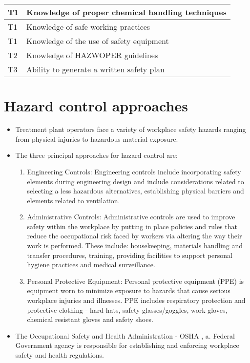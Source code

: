 \begin{table}[H]
\begin{tabular}{| m{1cm} |m{15cm} |}
T1 & Knowledge of proper   chemical handling techniques                                                                                \\ \hline
T1 & Knowledge of safe   working practices                                                                                             \\ \hline
T1 & Knowledge of the use   of safety equipment                                                                                        \\ \hline
T2 & Knowledge of HAZWOPER   guidelines                                                                                                \\ \hline
T3 & Ability to generate a   written safety plan                                                                                       \\ \hline
\end{tabular}
\end{table}
\newpage


\section{Hazard control approaches}
\begin{itemize}
\item Treatment plant operators face a variety of workplace safety hazards ranging from physical injuries to hazardous material exposure.  
\item The three principal approaches for hazard control are:
\begin{enumerate}
\item Engineering Controls:  Engineering controls include incorporating safety elements during engineering design and include considerations related to selecting a less hazardous alternatives, establishing  physical barriers and elements related to ventilation.
\item Administrative Controls:  Administrative controls are used to improve safety within the workplace by putting in place policies and rules that reduce the occupational risk faced by workers via altering the way their work is performed.  These include: housekeeping, materials handling and transfer procedures, training, providing facilities to support personal hygiene practices and medical surveillance.
\item Personal Protective Equipment: Personal protective equipment (PPE) is equipment worn to minimize exposure to hazards that cause serious workplace injuries and illnesses.  PPE includes respiratory protection and protective clothing - hard hats, safety
glasses/goggles, work gloves, chemical resistant gloves and safety shoes.

\end{enumerate}
\item The Occupational Safety and Health Administration - OSHA , a. Federal Government agency is responsible for establishing and enforcing workplace safety and health regulations.
\end{itemize}


